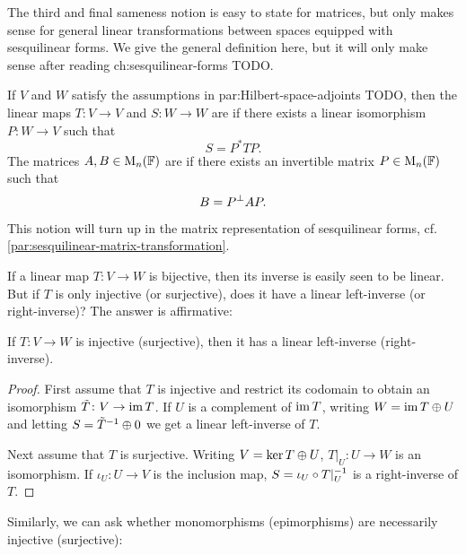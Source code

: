 The third and final sameness notion is easy to state for matrices, but only makes sense for general linear transformations between spaces equipped with sesquilinear forms. We give the general definition here, but it will only make sense after reading {ch:sesquilinear-forms} TODO.
%
\begin{definition}
    If $V$ and $W$ satisfy the assumptions in {par:Hilbert-space-adjoints} TODO, then the linear maps $T \colon V \to V$ and $S \colon W \to W$ are  if there exists a linear isomorphism $P \colon W \to V$ such that
    \begin{equation*}
        S = P^* TP.
    \end{equation*}
    The matrices $A,B \in \mathrm{M}_{n}(\mathbb{F})$ are  if there exists an invertible matrix $P \in \mathrm{M}_{n}(\mathbb{F})$ such that
    \begin{equation*}
        B
            = P^\bot AP.
    \end{equation*}
\end{definition}
%
This notion will turn up in the matrix representation of sesquilinear forms, cf. \cref{par:sesquilinear-matrix-transformation}. %



If a linear map $T \colon V \to W$ is bijective, then its inverse is easily seen to be linear. But if $T$ is only injective (or surjective), does it have a linear left-inverse (or right-inverse)? The answer is affirmative:

\begin{lemma}
    If $T \colon V \to W$ is injective (surjective), then it has a linear left-inverse (right-inverse).
\end{lemma}

\begin{proof}
    First assume that $T$ is injective and restrict its codomain to obtain an isomorphism $\tilde{T} \colon V \to \operatorname{im} T$. If $U$ is a complement of $\operatorname{im} T$, writing $W = \operatorname{im} T \oplus U$ and letting $S = \tilde{T}^{-1} \oplus 0$ we get a linear left-inverse of $T$.

    Next assume that $T$ is surjective. Writing $V = \ker T \oplus U$, $T|_U \colon U \to W$ is an isomorphism. If $\iota_U \colon U \to V$ is the inclusion map, $S = \iota_U \circ T|_U^{-1}$ is a right-inverse of $T$.
\end{proof}
%
Similarly, we can ask whether monomorphisms (epimorphisms) are necessarily injective (surjective):

